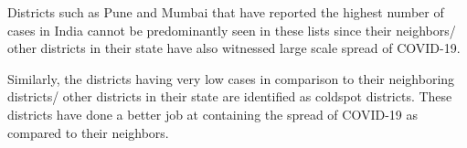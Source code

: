 \documentclass{article}
\begin{document}
Districts such as Pune and Mumbai that have reported the highest number of cases in India cannot be predominantly seen in these lists since their neighbors/ other districts in their state have also witnessed large scale spread of COVID-19.

Similarly, the districts having very low cases in comparison to their neighboring districts/ other districts in their state are identified as coldspot districts. These districts have done a better job at containing the spread of COVID-19 as compared to their neighbors.
\end{document}
